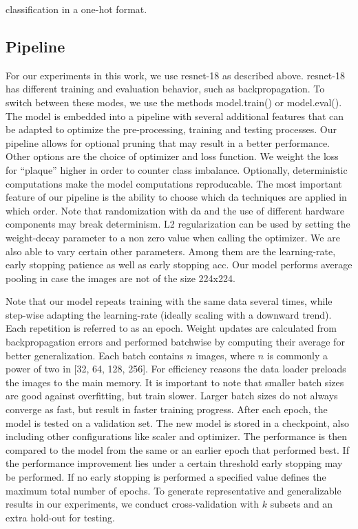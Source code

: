 classification in a one-hot format.

\subsection{Pipeline}

For our experiments in this work, we use \acrshort{resnet}-18 as described above. \acrshort{resnet}-18 has different training and evaluation behavior, such as backpropagation. To switch between these modes, we use the methods model.train() or model.eval(). The model is embedded into a pipeline with several additional features that can be adapted to optimize the pre-processing, training and testing processes. Our pipeline allows for optional pruning that may result in a better performance. Other options are the choice of optimizer and loss function. We weight the loss for “plaque” higher in order to counter class imbalance. Optionally, deterministic computations make the model computations reproducable. The most important feature of our pipeline is the ability to choose which \acrshort{da} techniques are applied in which order. Note that randomization with \acrshort{da} and the use of different hardware components may break determinism. L2 regularization can be used by setting the weight-decay parameter to a non zero value when calling the optimizer. We are also able to vary certain other parameters. Among them are the \gls{learning-rate}, early stopping patience as well as early stopping \acrshort{acc}. Our model performs average pooling in case the images are not of the size 224x224.

Note that our model repeats training with the same data several times, while step-wise adapting the \gls{learning-rate} (ideally scaling with a downward trend). Each repetition is referred to as an epoch. Weight updates are calculated from backpropagation errors and performed batchwise by computing their average for better generalization. Each batch contains \( n \) images, where \( n \) is commonly a power of two in [32, 64, 128, 256]. For efficiency reasons the data loader preloads the images to the main memory. It is important to note that smaller batch sizes are good against overfitting, but train slower. Larger batch sizes do not always converge as fast, but result in faster training progress. After each epoch, the model is tested on a validation set. The new model is stored in a checkpoint, also including other configurations like scaler and optimizer. The performance is then compared to the model from the same or an earlier epoch that performed best. If the performance improvement lies under a certain threshold early stopping may be performed. If no early stopping is performed a specified value defines the maximum total number of epochs. To generate representative and generalizable results in our experiments, we conduct cross-validation with \( k \) subsets and an extra hold-out for testing.

